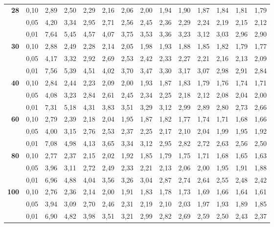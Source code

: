 \documentclass[12pt,a4paper]{article}
\begin{document}
{\begin{longtable}{@{\extracolsep{\fill}}rrrrrrrrrrrrrr@{}}
\addlinespace[1pt]
\textbf{28} & 0,10 & 2,89 & 2,50 & 2,29 & 2,16 & 2,06 & 2,00 & 1,94 & 1,90 & 1,87 & 1,84 & 1,81 & 1,79 \\*
 & 0,05 & 4,20 & 3,34 & 2,95 & 2,71 & 2,56 & 2,45 & 2,36 & 2,29 & 2,24 & 2,19 & 2,15 & 2,12 \\*
 & 0,01 & 7,64 & 5,45 & 4,57 & 4,07 & 3,75 & 3,53 & 3,36 & 3,23 & 3,12 & 3,03 & 2,96 & 2,90 \\
\addlinespace[1pt]
\textbf{30} & 0,10 & 2,88 & 2,49 & 2,28 & 2,14 & 2,05 & 1,98 & 1,93 & 1,88 & 1,85 & 1,82 & 1,79 & 1,77 \\*
 & 0,05 & 4,17 & 3,32 & 2,92 & 2,69 & 2,53 & 2,42 & 2,33 & 2,27 & 2,21 & 2,16 & 2,13 & 2,09 \\*
 & 0,01 & 7,56 & 5,39 & 4,51 & 4,02 & 3,70 & 3,47 & 3,30 & 3,17 & 3,07 & 2,98 & 2,91 & 2,84 \\
\addlinespace[1pt]
\textbf{40} & 0,10 & 2,84 & 2,44 & 2,23 & 2,09 & 2,00 & 1,93 & 1,87 & 1,83 & 1,79 & 1,76 & 1,74 & 1,71 \\*
 & 0,05 & 4,08 & 3,23 & 2,84 & 2,61 & 2,45 & 2,34 & 2,25 & 2,18 & 2,12 & 2,08 & 2,04 & 2,00 \\*
 & 0,01 & 7,31 & 5,18 & 4,31 & 3,83 & 3,51 & 3,29 & 3,12 & 2,99 & 2,89 & 2,80 & 2,73 & 2,66 \\
\addlinespace[1pt]
\textbf{60} & 0,10 & 2,79 & 2,39 & 2,18 & 2,04 & 1,95 & 1,87 & 1,82 & 1,77 & 1,74 & 1,71 & 1,68 & 1,66 \\*
 & 0,05 & 4,00 & 3,15 & 2,76 & 2,53 & 2,37 & 2,25 & 2,17 & 2,10 & 2,04 & 1,99 & 1,95 & 1,92 \\*
 & 0,01 & 7,08 & 4,98 & 4,13 & 3,65 & 3,34 & 3,12 & 2,95 & 2,82 & 2,72 & 2,63 & 2,56 & 2,50 \\
\addlinespace[1pt]
\textbf{80} & 0,10 & 2,77 & 2,37 & 2,15 & 2,02 & 1,92 & 1,85 & 1,79 & 1,75 & 1,71 & 1,68 & 1,65 & 1,63 \\*
 & 0,05 & 3,96 & 3,11 & 2,72 & 2,49 & 2,33 & 2,21 & 2,13 & 2,06 & 2,00 & 1,95 & 1,91 & 1,88 \\*
 & 0,01 & 6,96 & 4,88 & 4,04 & 3,56 & 3,26 & 3,04 & 2,87 & 2,74 & 2,64 & 2,55 & 2,48 & 2,42 \\
\addlinespace[1pt]
\textbf{100} & 0,10 & 2,76 & 2,36 & 2,14 & 2,00 & 1,91 & 1,83 & 1,78 & 1,73 & 1,69 & 1,66 & 1,64 & 1,61 \\*
 & 0,05 & 3,94 & 3,09 & 2,70 & 2,46 & 2,31 & 2,19 & 2,10 & 2,03 & 1,97 & 1,93 & 1,89 & 1,85 \\*
 & 0,01 & 6,90 & 4,82 & 3,98 & 3,51 & 3,21 & 2,99 & 2,82 & 2,69 & 2,59 & 2,50 & 2,43 & 2,37 \\

\end{longtable}}
\end{document}
